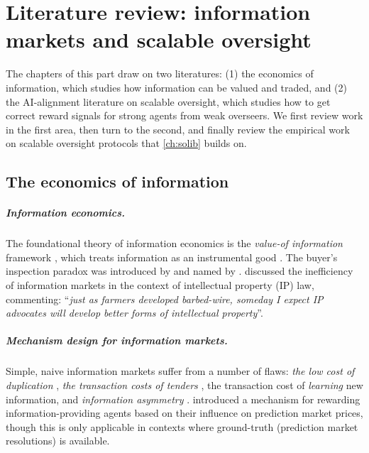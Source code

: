 \chapter{Literature review: information markets and scalable oversight}\label{ch:litrev-oversight}

\begin{draftblock}
\noindent The chapters of this part draw on two literatures: (1) the economics of information, which studies how information can be valued and traded, and (2) the AI-alignment literature on scalable oversight, which studies how to get correct reward signals for strong agents from weak overseers. We first review work in the first area, then turn to the second, and finally review the empirical work on scalable oversight protocols that \cref{ch:solib} builds on.
\end{draftblock}

\section{The economics of information}\label{litrev:sec:infoecon}
\label{infonomy:sec:related}
\paragraph{Information economics.} The foundational theory of information economics is the \emph{value-of information} framework , which treats information as an instrumental good . The buyer's inspection paradox was introduced by  and named by .  discussed the inefficiency of information markets in the context of intellectual property (IP) law, commenting: ``\emph{just as farmers developed barbed-wire, someday I expect IP advocates will develop better forms of intellectual property}''.

\paragraph{Mechanism design for information markets.} Simple, naive information markets suffer from a number of flaws: \emph{the low cost of duplication} , \emph{the transaction costs of tenders} , the transaction cost of \emph{learning} new information, and \emph{information asymmetry} .  introduced a mechanism for rewarding information-providing agents based on their influence on prediction market prices, though this is only applicable in contexts where ground-truth (prediction market resolutions) is available.
